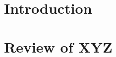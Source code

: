\documentclass[12pt,oneside,openany,letterpaper]{book} %
\begin{document}
\frontmatter %
\setcounter{tocdepth}{3} %
\tableofcontents %


 

\mainmatter %
\chapter{Introduction}
  
\chapter{Review of XYZ}
  
  
  
\end{document}
